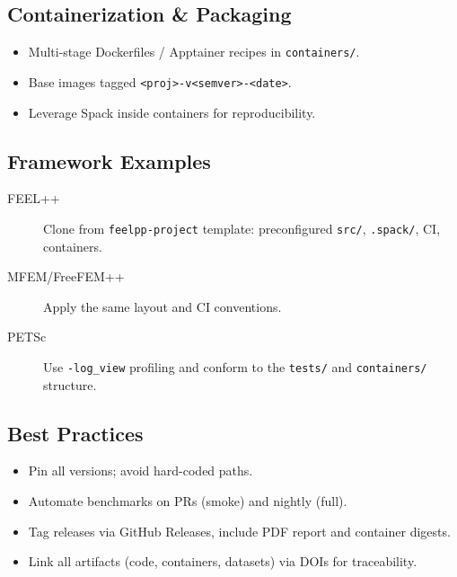 \subsection{Containerization \& Packaging}
\begin{itemize}
  \item Multi-stage Dockerfiles / Apptainer recipes in \texttt{containers/}.
  \item Base images tagged \texttt{<proj>-v<semver>-<date>}.
  \item Leverage Spack inside containers for reproducibility.
\end{itemize}

\subsection{Framework Examples}
\begin{description}
  \item[FEEL++] Clone from \texttt{feelpp-project} template: preconfigured \texttt{src/}, \texttt{.spack/}, CI, containers.
  \item[MFEM/FreeFEM++] Apply the same layout and CI conventions.
  \item[PETSc] Use \texttt{-log\_view} profiling and conform to the \texttt{tests/} and \texttt{containers/} structure.
\end{description}

\subsection{Best Practices}
\begin{itemize}
  \item Pin all versions; avoid hard-coded paths.
  \item Automate benchmarks on PRs (smoke) and nightly (full).
  \item Tag releases via GitHub Releases, include PDF report and container digests.
  \item Link all artifacts (code, containers, datasets) via DOIs for traceability.
\end{itemize}